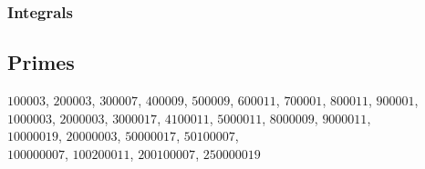 \documentclass[10pt]{article}
\begin{document}
\subsubsection{Integrals}

\subsection{Primes}
\noindent
$100003$, $200003$, $300007$, $400009$, $500009$, $600011$, $700001$, $800011$, $900001$, \\
$1000003$, $2000003$, $3000017$, $4100011$, $5000011$, $8000009$, $9000011$, \\
$10000019$, $20000003$, $50000017$, $50100007$, \\
$100000007$, $100200011$, $200100007$, $250000019$
\end{document}
